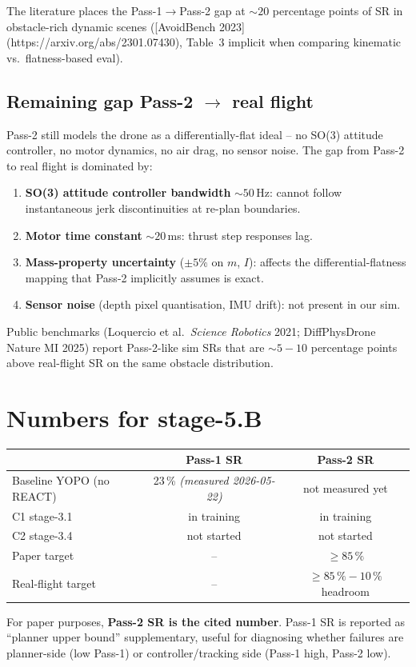\documentclass[11pt]{article}
\begin{document}
The literature places the Pass-1$\to$Pass-2 gap at ${\sim}20$ percentage points of SR in obstacle-rich dynamic scenes ([AvoidBench 2023](https://arxiv.org/abs/2301.07430), Table~3 implicit when comparing kinematic vs.\ flatness-based eval).

\subsection{Remaining gap Pass-2 $\to$ real flight}

Pass-2 still models the drone as a differentially-flat ideal -- no SO(3) attitude controller, no motor dynamics, no air drag, no sensor noise.  The gap from Pass-2 to real flight is dominated by:

\begin{enumerate}
  \item \textbf{SO(3) attitude controller bandwidth} ${\sim}50\,$Hz: cannot follow instantaneous jerk discontinuities at re-plan boundaries.
  \item \textbf{Motor time constant} ${\sim}20\,$ms: thrust step responses lag.
  \item \textbf{Mass-property uncertainty} (${\pm}5\%$ on $m$, $I$): affects the differential-flatness mapping that Pass-2 implicitly assumes is exact.
  \item \textbf{Sensor noise} (depth pixel quantisation, IMU drift): not present in our sim.
\end{enumerate}

Public benchmarks (Loquercio et al.\ \emph{Science Robotics} 2021; DiffPhysDrone Nature MI 2025) report Pass-2-like sim SRs that are ${\sim}5{-}10$ percentage points above real-flight SR on the same obstacle distribution.

\section{Numbers for stage-5.B}

\begin{center}
\begin{tabular}{lcc}
\hline
                          & Pass-1 SR             & Pass-2 SR             \\
\hline
Baseline YOPO (no REACT)  & 23\,\% \emph{(measured 2026-05-22)} & not measured yet \\
C1 stage-3.1              & in training           & in training           \\
C2 stage-3.4              & not started           & not started           \\
Paper target              & --                    & $\ge 85\,\%$          \\
Real-flight target        & --                    & $\ge 85\,\% - 10\,\%$ headroom \\
\hline
\end{tabular}
\end{center}

For paper purposes, \textbf{Pass-2 SR is the cited number}.  Pass-1 SR is reported as ``planner upper bound'' supplementary, useful for diagnosing whether failures are planner-side (low Pass-1) or controller/tracking side (Pass-1 high, Pass-2 low).
\end{document}
